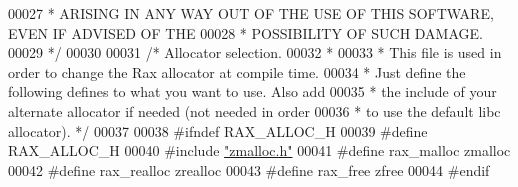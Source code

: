 \begin{DoxyCode}
00027 \textcolor{comment}{ * ARISING IN ANY WAY OUT OF THE USE OF THIS SOFTWARE, EVEN IF ADVISED OF THE}
00028 \textcolor{comment}{ * POSSIBILITY OF SUCH DAMAGE.}
00029 \textcolor{comment}{ */}
00030 
00031 \textcolor{comment}{/* Allocator selection.}
00032 \textcolor{comment}{ *}
00033 \textcolor{comment}{ * This file is used in order to change the Rax allocator at compile time.}
00034 \textcolor{comment}{ * Just define the following defines to what you want to use. Also add}
00035 \textcolor{comment}{ * the include of your alternate allocator if needed (not needed in order}
00036 \textcolor{comment}{ * to use the default libc allocator). */}
00037 
00038 \textcolor{preprocessor}{#}\textcolor{preprocessor}{ifndef} \textcolor{preprocessor}{RAX\_ALLOC\_H}
00039 \textcolor{preprocessor}{#}\textcolor{preprocessor}{define} \textcolor{preprocessor}{RAX\_ALLOC\_H}
00040 \textcolor{preprocessor}{#}\textcolor{preprocessor}{include} \hyperlink{zmalloc_8h}{"zmalloc.h"}
00041 \textcolor{preprocessor}{#}\textcolor{preprocessor}{define} \textcolor{preprocessor}{rax\_malloc} \textcolor{preprocessor}{zmalloc}
00042 \textcolor{preprocessor}{#}\textcolor{preprocessor}{define} \textcolor{preprocessor}{rax\_realloc} \textcolor{preprocessor}{zrealloc}
00043 \textcolor{preprocessor}{#}\textcolor{preprocessor}{define} \textcolor{preprocessor}{rax\_free} \textcolor{preprocessor}{zfree}
00044 \textcolor{preprocessor}{#}\textcolor{preprocessor}{endif}
\end{DoxyCode}
